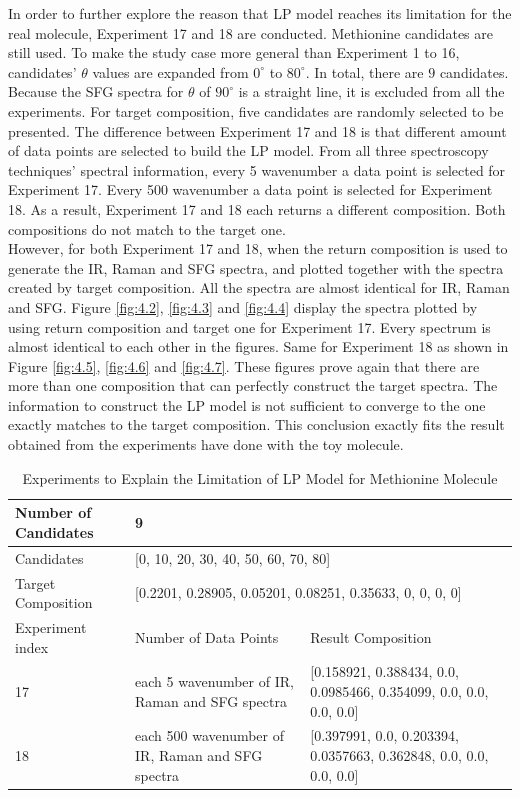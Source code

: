 In order to further explore the reason that LP model reaches its limitation for the real molecule, Experiment 17 and 18 are conducted. Methionine candidates are still used. To make the study case more general than Experiment 1 to 16, candidates' $\theta$ values are expanded from $0^{\circ}$ to $80^{\circ}$. In total, there are $9$ candidates. Because the SFG spectra for $\theta$ of $90^{\circ}$ is a straight line, it is excluded from all the experiments. For target composition, five candidates are randomly selected to be presented. The difference between Experiment 17 and 18 is that different amount of data points are selected to build the LP model. From all three spectroscopy techniques' spectral information, every 5 wavenumber a data point is selected for Experiment 17. Every 500 wavenumber a data point is selected for Experiment 18. As a result, Experiment 17 and 18 each returns a different composition. Both compositions do not match to the target one. \\

However, for both Experiment 17 and 18, when the return composition is used to generate the IR, Raman and SFG spectra, and plotted together with the spectra created by target composition. All the spectra are almost identical for IR, Raman and SFG. Figure \ref{fig:4.2}, \ref{fig:4.3} and \ref{fig:4.4} display the spectra plotted by using return composition and target one for Experiment 17. Every spectrum is almost identical to each other in the figures. Same for Experiment 18 as shown in Figure \ref{fig:4.5}, \ref{fig:4.6} and \ref{fig:4.7}. These figures prove again that there are more than one composition that can perfectly construct the target spectra. The information to construct the LP model is not sufficient to converge to the one exactly matches to the target composition. This conclusion exactly fits the result obtained from the experiments have done with the toy molecule.\\

\begin{table}\tiny \label{tab:4.4}
\begin{center}
\begin{tabular}{| l | l | l | l }
\hline
Number of Candidates & \multicolumn{2}{l|}{9} \\ \hline
Candidates & \multicolumn{2}{l|}{[0, 10, 20, 30, 40, 50, 60, 70, 80]} \\ \hline
Target Composition & \multicolumn{2}{l|}{[0.2201, 0.28905, 0.05201, 0.08251, 0.35633, 0, 0, 0, 0]} \\ \hline
Experiment index & Number of Data Points & Result Composition \\ \hline
17 & each 5 wavenumber of IR, Raman and SFG spectra & [0.158921, 0.388434, 0.0, 0.0985466, 0.354099, 0.0, 0.0, 0.0, 0.0] \\ \hline
18 & each 500 wavenumber of IR, Raman and SFG spectra & [0.397991, 0.0, 0.203394, 0.0357663, 0.362848, 0.0, 0.0, 0.0, 0.0] \\ \hline
\end{tabular} 
\end{center}
\caption{Experiments to Explain the Limitation of LP Model for Methionine Molecule}
\end{table}	

